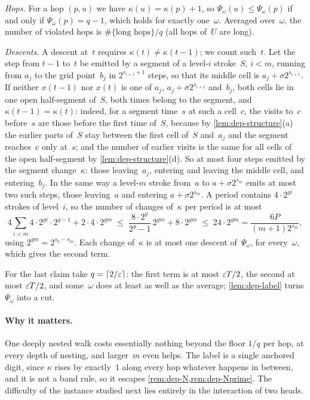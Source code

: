 \begin{informalproof}
\emph{Hops.} For a hop $(p,u)$ we have $\kappa(u)=\kappa(p)+1$, so $\Psi_\omega(u)\le\Psi_\omega(p)$ if and only if
$\Psi_\omega(p)=q-1$, which holds for exactly one~$\omega$. Averaged over~$\omega$, the number of violated hops is
$\#\{\text{long hops}\}/q$ (all hops of~$U$ are long).

\emph{Descents.} A descent at~$t$ requires $\kappa(t)\ne\kappa(t-1)$; we count such~$t$. Let the step from $t-1$ to~$t$
be emitted by a segment of a level-$i$ stroke~$S$, $i<m$, running from $a_j$ to the grid point~$b_j$ in
$2^{s_{i+1}+1}$ steps, so that its middle cell is $a_j+\sigma2^{s_{i+1}}$. If neither $x(t-1)$ nor $x(t)$ is one of
$a_j$, $a_j+\sigma2^{s_{i+1}}$ and~$b_j$, both cells lie in one open half-segment of~$S$, both times belong to the
segment, and $\kappa(t-1)=\kappa(t)$: indeed, for a segment time~$s$ at such a cell~$c$, the visits to~$c$ before~$s$
are those before the first time of~$S$, because by \cref{lem:dep-structure}(a) the earlier parts of~$S$ stay between
the first cell of~$S$ and~$a_j$ and the segment reaches~$c$ only at~$s$; and the number of earlier visits is the same
for all cells of the open half-segment by \cref{lem:dep-structure}(d). So at most four steps emitted by the segment
change~$\kappa$: those leaving~$a_j$, entering and leaving the middle cell, and entering~$b_j$. In the same way a
level-$m$ stroke from~$a$ to $a+\sigma2^{s_m}$ emits at most two such steps, those leaving~$a$ and entering
$a+\sigma2^{s_m}$. A period contains $4\cdot2^{gi}$ strokes of level~$i$, so the number of changes of~$\kappa$ per
period is at most
\[
  4\sum_{i<m}4\cdot2^{gi}\cdot2^{g-1}+2\cdot4\cdot2^{gm}\;\le\;\frac{8\cdot2^g}{2^g-1}\,2^{gm}+8\cdot2^{gm}
  \;\le\;24\cdot2^{gm}=\frac{6P}{(m+1)2^{s_m}},
\]
using $2^{gm}=2^{s_0-s_m}$. Each change of~$\kappa$ is at most one descent of~$\Psi_\omega$, for every~$\omega$, which
gives the second term.

For the last claim take $q=\lceil2/\varepsilon\rceil$: the first term is at most $\varepsilon T/2$, the second at most $\varepsilon T/2$,
and some~$\omega$ does at least as well as the average; \cref{lem:dep-label} turns $\Psi_\omega$ into a cut.
\end{informalproof}

\paragraph{Why it matters.} One deeply nested walk costs essentially nothing beyond the floor $1/q$ per hop, at every
depth of nesting, and larger~$m$ even helps. The label is a single anchored digit, since $\kappa$ rises by exactly~$1$
along every hop whatever happens in between, and it is not a band rule, so it escapes \cref{rem:dep-N,rem:dep-Nprime}. The
difficulty of the instance studied next lies entirely in the interaction of two heads.

